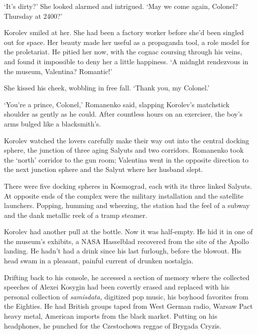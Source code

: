 `It's dirty?' She looked alarmed and intrigued. `May we come again, Colonel? Thursday at 2400?'

Korolev smiled at her. She had been a factory worker before she'd been singled out for space. Her beauty made her useful as a propaganda tool, a role model for the proletariat. He pitied her now, with the cognac coursing through his veins, and found it impossible to deny her a little happiness. `A midnght rendezvous in the museum, Valentina? Romantic!'

She kissed his cheek, wobbling in free fall. `Thank you, my Colonel.'

`You're a prince, Colonel,' Romanenko said, slapping Korolev's matchstick shoulder as gently as he could. After countless hours on an exerciser, the boy's arms bulged like a blacksmith's.

Korolev watched the lovers carefully make their way out into the central docking sphere, the junction of three aging Salyuts and two corridors. Romanenko took the `north' corridor to the gun room; Valentina went in the opposite direction to the next junction sphere and the Salyut where her husband slept.

There were five docking spheres in Kosmograd, each with its three linked Salyuts. At opposite ends of the complex were the military installation and the satellite launchers. Popping, humming and wheezing, the station had the feel of a subway and the dank metallic reek of a tramp steamer.

Korolev had another pull at the bottle. Now it was half-empty. He hid it in one of the museum's exhibits, a NASA Hasselblad recovered from the site of the Apollo landing. He hadn't had a drink since his last furlough, before the blowout. His head swam in a pleasant, painful current of drunken nostalgia.

Drifting back to his console, he accessed a section of memory where the collected speeches of Alexei Kosygin had been covertly erased and replaced with his personal collection of \textit{samisdata,} digitized pop music, his boyhood favorites from the Eighties. He had British groups taped from West German radio, Warsaw Pact heavy metal, American imports from the black market. Putting on his headphones, he punched for the Czestochowa reggae of Brygada Cryzis.

